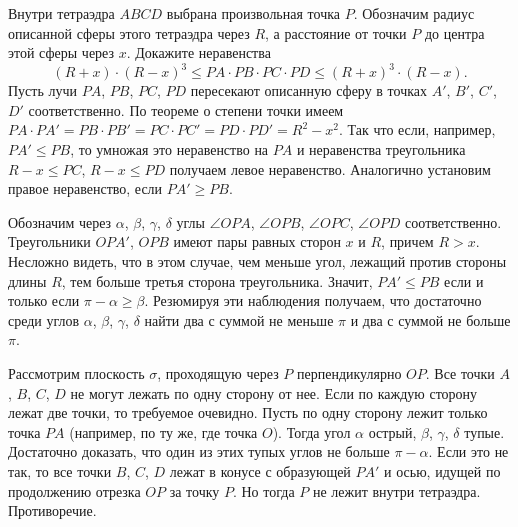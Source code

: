 \problem
Внутри тетраэдра $ABCD$ выбрана произвольная точка $P$.
Обозначим радиус описанной сферы этого тетраэдра через $R$, а расстояние от
точки $P$ до центра этой сферы через $x$.
Докажите неравенства
\[
    (R + x) \cdot (R - x)^3
\leq
    PA \cdot PB \cdot PC \cdot PD
\leq
    (R + x)^3 \cdot (R - x)
.\]
\solution
Пусть лучи $PA$, $PB$, $PC$, $PD$ пересекают описанную сферу в точках
$A'$, $B'$, $C'$, $D'$ соответственно.
По теореме о степени точки имеем
$PA \cdot PA' = PB \cdot PB' = PC \cdot PC' = PD \cdot PD' = R^2 - x^2$.
Так что если, например, $PA' \leq PB$, то умножая это неравенство на $PA$ и
неравенства треугольника $R - x \leq PC$, $R - x \leq PD$ получаем левое
неравенство.
Аналогично установим правое неравенство, если $PA' \geq PB$.
\par
Обозначим через $\alpha$, $\beta$, $\gamma$, $\delta$ углы
$\angle OPA$, $\angle OPB$, $\angle OPC$, $\angle OPD$ соответственно.
Треугольники $OPA'$, $OPB$ имеют пары равных сторон $x$ и $R$, причем $R > x$.
Несложно видеть, что в этом случае, чем меньше угол, лежащий против стороны
длины $R$, тем больше третья сторона треугольника.
Значит, $PA' \leq PB$ если и только если $\pi - \alpha \geq \beta$.
Резюмируя эти наблюдения получаем, что достаточно среди углов
$\alpha$, $\beta$, $\gamma$, $\delta$ найти два с суммой не меньше $\pi$ и
два с суммой не больше $\pi$.
\par
Рассмотрим плоскость $\sigma$, проходящую через $P$ перпендикулярно $OP$.
Все точки $A$, $B$, $C$, $D$ не могут лежать по одну сторону от нее.
Если по каждую сторону лежат две точки, то требуемое очевидно.
Пусть по одну сторону лежит только точка $PA$
(например, по ту же, где точка $O$).
Тогда угол  $\alpha$ острый, $\beta$, $\gamma$, $\delta$ тупые.
Достаточно доказать, что один из этих тупых углов не больше $\pi - \alpha$.
Если это не так, то все точки $B$, $C$, $D$ лежат в конусе с образующей $PA'$ и осью, идущей по продолжению отрезка $OP$ за точку $P$.
Но тогда $P$ не лежит внутри тетраэдра.
Противоречие.
\endproblem
